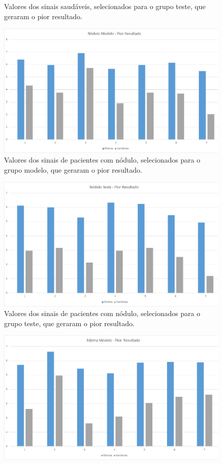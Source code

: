 \documentclass[a4paper,12pt,oneside]{report}
\begin{document}
\begin{appendices}
\begin{figure}
\caption{Valores dos sinais saud\'{a}veis, selecionados para o grupo teste, que geraram o pior resultado. }
\label{fig:normal_teste_pior}
\end{figure}
\begin{figure}
\centering
\includegraphics[width=0.70\hsize]{figuras_tcc/pior_resultado/nodulo_modelo_pior.eps}
\caption{Valores dos sinais de pacientes com n\'{o}dulo, selecionados para o grupo modelo, que geraram o pior resultado.}
\label{fig:nodulo_modelo_pior}
\end{figure}
\begin{figure}
\centering
\includegraphics[width=0.70\hsize]{figuras_tcc/pior_resultado/nodulo_teste_pior.eps}
\caption{Valores dos sinais de pacientes com n\'{o}dulo, selecionados para o grupo teste, que geraram o pior resultado. }
\label{fig:nodulo_teste_pior}
\end{figure}
\begin{figure}
\centering
\includegraphics[width=0.70\hsize]{figuras_tcc/pior_resultado/edema_modelo_pior.eps}

\end{figure}
\end{appendices}
\end{document}
